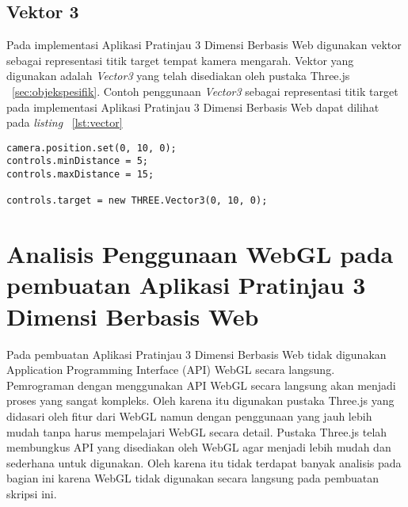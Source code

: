 \subsection{Vektor 3}
Pada implementasi Aplikasi Pratinjau 3 Dimensi Berbasis Web digunakan vektor sebagai representasi titik target tempat kamera mengarah. Vektor yang digunakan adalah {\it Vector3} yang telah disediakan oleh pustaka Three.js ~\ref{sec:objekspesifik}. Contoh penggunaan {\it Vector3} sebagai representasi titik target pada implementasi Aplikasi Pratinjau 3 Dimensi Berbasis Web dapat dilihat pada {\it listing} ~\ref{lst:vector}
\begin{lstlisting}[caption={Contoh penggunaan {\it Vector3}}, label={lst:vector},captionpos=b]
camera.position.set(0, 10, 0);
controls.minDistance = 5;
controls.maxDistance = 15;

controls.target = new THREE.Vector3(0, 10, 0);
\end{lstlisting}

\section{Analisis Penggunaan WebGL pada pembuatan Aplikasi Pratinjau 3 Dimensi Berbasis Web}
Pada pembuatan Aplikasi Pratinjau 3 Dimensi Berbasis Web tidak digunakan Application Programming Interface (API) WebGL secara langsung. Pemrograman dengan menggunakan API WebGL secara langsung akan menjadi proses yang sangat kompleks. Oleh karena itu digunakan pustaka Three.js yang didasari oleh fitur dari WebGL namun dengan penggunaan yang jauh lebih mudah tanpa harus mempelajari WebGL secara detail. Pustaka Three.js telah membungkus API yang disediakan oleh WebGL agar menjadi lebih mudah dan sederhana untuk digunakan. Oleh karena itu tidak terdapat banyak analisis pada bagian ini karena WebGL tidak digunakan secara langsung pada pembuatan skripsi ini. 










